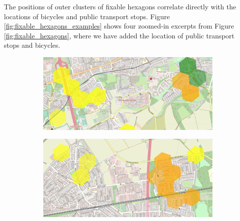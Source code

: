 The positions of outer clusters of fixable hexagons correlate directly with the locations of bicycles and public transport stops.
Figure \ref{fig:fixable_hexagons_examples} shows four zoomed-in excerpts from Figure \ref{fig:fixable_hexagons}, where we have added the location of public transport stops and bicycles.
\begin{figure}
     \centering
     \begin{subfigure}[b]{0.45\textwidth}
         \centering
         \includegraphics[width=\textwidth]{Figures/results/problematic_hexagons/example_1.png}
     \end{subfigure}
     \hfill
     \begin{subfigure}[b]{0.45\textwidth}
         \centering
         \includegraphics[width=\textwidth]{Figures/results/problematic_hexagons/example_2.png}
     \end{subfigure}
     \hfill
     \begin{subfigure}[b]{0.45\textwidth}
         \centering

\end{subfigure}
\end{figure}
